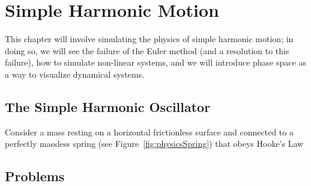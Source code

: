 %
\chapter{Simple Harmonic Motion}
\label{ch-shm} %
This chapter will involve simulating the physics of simple harmonic motion; in doing so, we will see the failure of the Euler method (and a resolution to this failure), how to simulate non-linear systems, and we will introduce phase space as a way to visualize dynamical systems. 

\section{The Simple Harmonic Oscillator}
\label{sec-simpleHarmonicOscillator}

Consider a mass resting on a horizontal frictionless surface and connected to a perfectly massless spring (see Figure~\ref{fig:physicsSpring}) that obeys Hooke's Law

\pagebreak 

\section*{Problems}
%

\begin{prob}
\label{prob6.1}

\end{prob}


%
